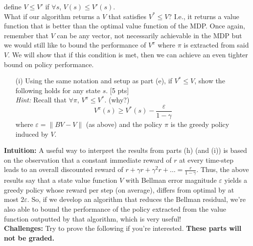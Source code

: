 \documentclass[11pt]{article}
\let\epsilon\varepsilon
\begin{document}
\newpage
{} define $V \leq V'$ if $\forall s$, $V(s) \leq V'(s)$. 
\\

\noindent What if our algorithm returns a $V$ that satisfies $V^* \leq V$? I.e., it returns a value function that is better than the optimal value function of the MDP. Once again, remember that $V$ can be any vector, not necessarily achievable in the MDP but we would still like to bound the performance of $V^\pi$ where $\pi$ is extracted from said $V$. We will show that if this condition is met, then we can achieve an even tighter bound on policy performance.



\begin{enumerate}
    \item[(i)] Using the same notation and setup as part (e), if $V^* \leq V$, show the following holds for any state $s$. [5 pts]\\
    \textit{Hint:} Recall that $\forall \pi$, $V^\pi \leq V^*$. (why?)
    \begin{equation}
        V^\pi(s) \geq V^*(s) - \frac{\epsilon}{1-\gamma}
    \end{equation}
     where $\epsilon = \|B V - V\|$  (as above) and the policy $\pi$ is the greedy policy induced by $V$. 
\end{enumerate}

\noindent \textbf{Intuition:} A useful way to interpret the results from parts (h) (and (i)) is based on the observation that a constant immediate reward of $r$ at every time-step leads to an overall discounted reward of $r + \gamma r + \gamma^2 r + \ldots = \frac{r}{1-\gamma}$. Thus, the above results say that a state value function $V$ with Bellman error magnitude $\epsilon$ yields a greedy policy whose reward per step (on average), differs from optimal by at most $2\epsilon$. So, if we develop an algorithm that reduces the Bellman residual, we're also able to bound the performance of the policy extracted from the value function outputted by that algorithm, which is very useful!
\\
\newpage
\noindent \textbf{Challenges:} Try to prove the following if you're interested. \textbf{These parts will not be graded.}
\end{document}
